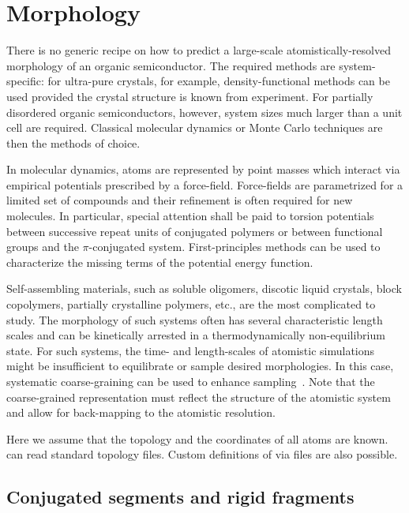 \chapter{Morphology}
\label{sec:morphology}

There is no generic recipe on how to predict a large-scale atomistically-resolved morphology of an organic semiconductor. The required methods are system-specific: for ultra-pure crystals, for example, density-functional methods can be used provided the crystal structure is known from experiment. For partially disordered organic semiconductors, however, system sizes much larger than a unit cell  are required. Classical molecular dynamics or Monte Carlo techniques are then the methods of choice. 

In molecular dynamics, atoms are represented by point masses which interact via empirical potentials prescribed by a force-field. Force-fields are parametrized for a limited set of compounds and their refinement is often required for new molecules. In particular, special attention shall be paid to torsion potentials between successive repeat units of conjugated polymers or between functional groups and the $\pi$-conjugated system. First-principles methods can be used to characterize the missing terms of the potential energy function. 

Self-assembling materials, such as soluble oligomers, discotic liquid crystals, block copolymers, partially crystalline polymers, etc., are the most complicated to study. The morphology of such systems often has several characteristic length scales and can be kinetically arrested in a thermodynamically non-equilibrium state. For such systems, the time- and length-scales of atomistic simulations might be insufficient to equilibrate or sample desired morphologies. In this case, systematic coarse-graining can be used to enhance sampling~\cite{ruhle_versatile_2009}. Note that the coarse-grained representation must reflect the structure of the atomistic system and allow for back-mapping to the atomistic resolution.

Here we assume that the topology and the coordinates of all atoms are known. \votcactp can read standard \gromacs topology files. Custom definitions of  via \xml files are also possible.


\section{Conjugated segments and rigid fragments}
\label{sec:segments}

